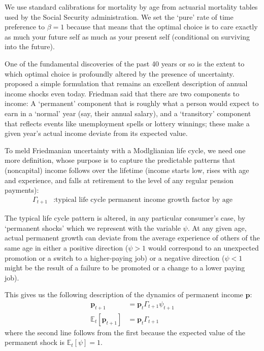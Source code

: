 \documentclass{article}
\newcommand{\pLvl}{\mathbf{p}}
\newcommand{\Ex}{\mathbb{E}}
\newcommand{\permGroFac}{\Gamma}
\newcommand{\permShk}{\psi}
\begin{document}
We use standard calibrations for mortality by age from actuarial mortality tables used by the Social Security administration. We set the `pure' rate of time preference to $\beta=1$ because that means that the optimal choice is to care exactly as much your future self as much as your present self (conditional on surviving into the future).

One of the fundamental discoveries of the past 40 years or so is the extent to which optimal choice is profoundly altered by the presence of uncertainty. \cite{friedman1957} proposed a simple formulation that remains an excellent description of annual income shocks even today. Friedman said that there are two components to income: A `permanent' component that is roughly what a person would expect to earn in a `normal' year (say, their annual salary), and a `transitory' component that reflects events like unemployment spells or lottery winnings; these make a given year's actual income deviate from its expected value.

To meld Friedmanian uncertainty with a Modlglianian life cycle, we need one more definition, whose purpose is to capture the predictable patterns that (noncapital) income follows over the lifetime (income starts low, rises with age and experience, and falls at retirement to the level of any regular pension payments):
\begin{align}
    \permGroFac_{t+1} & : \text{typical life cycle permanent income growth factor by age}
\end{align}

The typical life cycle pattern is altered, in any particular consumer's case, by `permanent shocks' which we represent with the variable $\permShk$. At any given age, actual permanent growth can deviate from the average experience of others of the same age in either a positive direction ($\psi>1$ would correspond to an unexpected promotion or a switch to a higher-paying job) or a negative direction ($\psi < 1$ might be the result of a failure to be promoted or a change to a lower paying job).

This gives us the following description of the dynamics of permanent income $\pLvl$:
\begin{align}
    \pLvl_{t+1} & = \pLvl_{t} \permGroFac_{t+1} \permShk_{t+1}
    \\ \Ex_{t}[\pLvl_{t+1}] & = \pLvl_{t} \permGroFac_{t+1}
\end{align}
where the second line follows from the first because the expected value of the permanent shock is $\Ex_{t}[\permShk]=1$.
\end{document}
